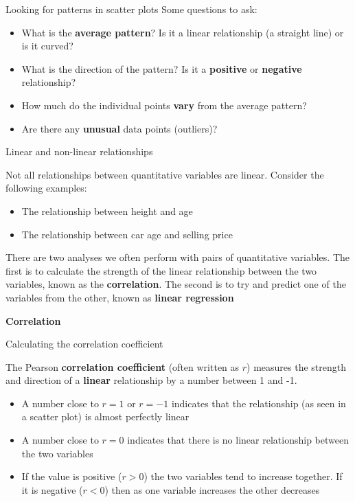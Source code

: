 \documentclass[12pt,xcolor=dvipsnames,handout,mathserif,aspectratio=169]{beamer}
\newcommand{\bbl}[1]{{\color{NavyBlue} \textbf{#1}}}
\newcommand{\bre}[1]{{\color{red} \textbf{#1}}}
\newcommand{\bgr}[1]{{\color{PineGreen} \textbf{#1}}}
\begin{document}
\begin{frame}{Looking for patterns in scatter plots}
Some questions to ask:
\begin{itemize}
\item What is the \bbl{average pattern}? Is it a linear relationship (a straight line) or is it curved?
\item What is the direction of the pattern? Is it a \bgr{positive} or \bre{negative} relationship?
\item How much do the individual points \bre{vary} from the average pattern?
\item Are there any \bre{unusual} data points (outliers)?
\end{itemize}
\end{frame}

\begin{frame}{Linear and non-linear relationships}

Not all relationships between quantitative variables are linear. Consider the following examples:
\begin{itemize}
\item The relationship between height and age
\item The relationship between car age and selling price
\end{itemize}
\pause
\vspace{0.2cm}
There are two analyses we often perform with pairs of quantitative variables. The first is to calculate the strength of the linear relationship between the two variables, known as the \bbl{correlation}. The second is to try and predict one of the variables from the other, known as \bbl{linear regression}

\end{frame}

\begin{frame}[fragile]{}
\bbl{\Huge Correlation}\\ 
\vspace{0.5cm}
\end{frame}


\begin{frame}{Calculating the correlation coefficient}

The Pearson \bbl{correlation coefficient} (often written as $r$) measures the strength and direction of a \bre{linear} relationship by a number between 1 and -1. 
\begin{itemize}
\item A number close to $r=1$ or $r=-1$ indicates that the relationship (as seen in a scatter plot) is almost perfectly linear
\pause
\item A number close to $r=0$ indicates that there is no linear relationship between the two variables
\pause
\item If the value is positive ($r>0$) the two variables tend to increase together. If it is negative ($r<0$) then as one variable increases the other decreases
\end{itemize}

\end{frame}
\end{document}
